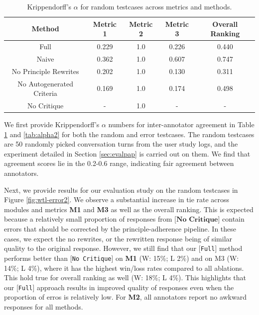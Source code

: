 \documentclass[11pt]{article}
\begin{document}
\begin{table}[h!]
\small
\centering
\begin{tabular}{|c|c|c|c|c|}
\hline
Method                    & Metric 1 & Metric 2 & Metric 3 & Overall Ranking \\ \hline
Full                      & 0.229    & 1.0   & 0.226       & 0.440           \\ \hline
Naive                     & 0.362  & 1.0     & 0.607       & 0.747           \\ \hline
No Principle Rewrites     & 0.202  & 1.0     & 0.130       & 0.311           \\ \hline
No Autogenerated Criteria & 0.169   & 1.0    & 0.174       & 0.498           \\ \hline
No Critique & -   & 1.0    & -       & -           \\ \hline
\end{tabular}
\caption{Krippendorff's $\alpha$ for random testcases across metrics and methods.}
\label{tab:alpha1}
\end{table}

We first provide Krippendorff's $\alpha$ numbers for inter-annotator agreement in Table \ref{tab:alpha1} and \ref{tab:alpha2} for both the random and error testcases. The random testcases are 50 randomly picked conversation turns from the user study logs, and the experiment detailed in Section \ref{sec:evalpap} is carried out on them. We find that agreement scores lie in the 0.2-0.6 range, indicating fair agreement between annotators.

Next, we provide results for our evaluation study on the random testcases in Figure \ref{fig:wtl-error2}. We observe a substantial increase in tie rate across modules and metrics \textbf{M1} and \textbf{M3} as well as the overall ranking. This is expected because a relatively small proportion of responses from [$\textbf{No Critique}$] contain errors that should be corrected by the principle-adherence pipeline. In these cases, we expect the no rewrites, or the rewritten response being of similar quality to the original response. However, we still find that our [\texttt{Full}]
method performs better than [\texttt{No Critique}] on
\textbf{M1} (W: 15\%; L 2\%) and on M3 (W: 14\%; L 4\%), where it has the highest win/loss rates compared to all ablations. This hold true for overall ranking as well (W: 18\%; L 4\%). This highlights that our [\texttt{Full}] approach results in improved quality of responses even when the proportion of erros is relatively low. For \textbf{M2}, all annotators report no awkward responses for all methods. 
\end{document}
